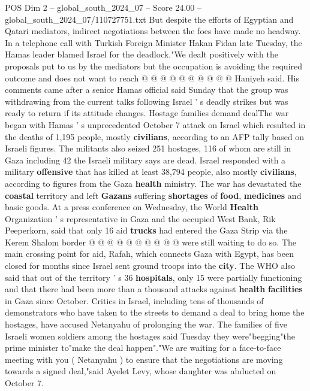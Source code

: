 \begin{textsample}{POS Dim 2 – global\_south\_2024\_07 – Score 24.00 – global\_south\_2024\_07/110727751.txt}
But despite the efforts of Egyptian and Qatari mediators, indirect negotiations between the foes have made no headway.
In a telephone call with Turkish Foreign Minister Hakan Fidan late Tuesday, the Hamas leader blamed Israel for the deadlock."We dealt positively with the proposals put to us by the mediators but the occupation is avoiding the required outcome and does not want to reach @ @ @ @ @ @ @ @ @ @ Haniyeh said.
His comments came after a senior Hamas official said Sunday that the group was withdrawing from the current talks following Israel ' s deadly strikes but was ready to return if its attitude changes.
Hostage families demand dealThe war began with Hamas ' s unprecedented October 7 attack on Israel which resulted in the deaths of 1,195 people, mostly \textbf{civilians}, according to an AFP tally based on Israeli figures.
The militants also seized 251 hostages, 116 of whom are still in Gaza including 42 the Israeli military says are dead.
Israel responded with a military \textbf{offensive} that has killed at least 38,794 people, also mostly \textbf{civilians}, according to figures from the Gaza \textbf{health} ministry.
The war has devastated the \textbf{coastal} territory and left \textbf{Gazans} suffering \textbf{shortages} of \textbf{food}, \textbf{medicines} and basic goods.
At a press conference on Wednesday, the World \textbf{Health} Organization ' s representative in Gaza and the occupied West Bank, Rik Peeperkorn, said that only 16 aid \textbf{trucks} had entered the Gaza Strip via the Kerem Shalom border @ @ @ @ @ @ @ @ @ @ were still waiting to do so.
The main crossing point for aid, Rafah, which connects Gaza with Egypt, has been closed for months since Israel sent ground troops into the \textbf{city}.
The WHO also said that out of the territory ' s 36 \textbf{hospitals}, only 15 were partially functioning and that there had been more than a thousand attacks against \textbf{health} \textbf{facilities} in Gaza since October.
Critics in Israel, including tens of thousands of demonstrators who have taken to the streets to demand a deal to bring home the hostages, have accused Netanyahu of prolonging the war.
The families of five Israeli women soldiers among the hostages said Tuesday they were"begging"the prime minister to"make the deal happen"."We are waiting for a face-to-face meeting with you ( Netanyahu ) to ensure that the negotiations are moving towards a signed deal,"said Ayelet Levy, whose daughter was abducted on October 7.

\end{textsample}
